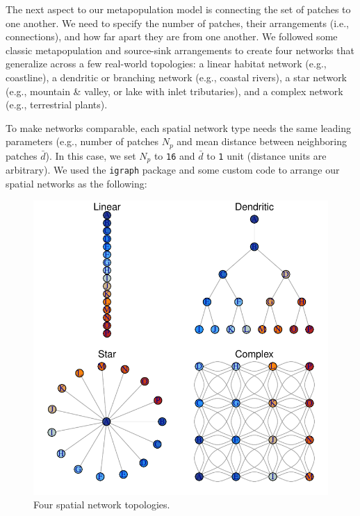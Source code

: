 \documentclass[]{article}
\begin{document}
The next aspect to our metapopulation model is connecting the set of
patches to one another. We need to specify the number of patches, their
arrangements (i.e., connections), and how far apart they are from one
another. We followed some classic metapopulation and source-sink
arrangements to create four networks that generalize across a few
real-world topologies: a linear habitat network (e.g., coastline), a
dendritic or branching network (e.g., coastal rivers), a star network
(e.g., mountain \& valley, or lake with inlet tributaries), and a
complex network (e.g., terrestrial plants).

To make networks comparable, each spatial network type needs the same
leading parameters (e.g., number of patches \(N_p\) and mean distance
between neighboring patches \(\bar{d}\)). In this case, we set \(N_p\)
to \texttt{16} and \(\bar{d}\) to \texttt{1} unit (distance units are
arbitrary). We used the \texttt{igraph} package and some custom code to
arrange our spatial networks as the following:

\begin{figure}[H]

{\centering \includegraphics{Managing_for_ecological_surprises_in_metapopulations_makeHTML_files/figure-latex/networks-1} 

}

\caption{Four spatial network topologies.}\label{fig:networks}
\end{figure}
\end{document}
